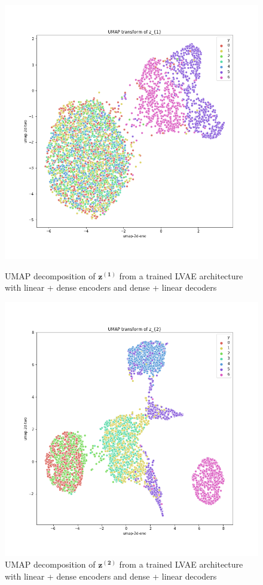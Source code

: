 \documentclass[12pt, english]{article}
\begin{document}
\begin{figure}[H] 
  \begin{minipage}{0.48\linewidth}
    \centering
    \includegraphics[width=.7\linewidth]{umap_z1_dense_lin_lin_no_norm.png}
    \caption{UMAP decomposition of $\bm{z^{(1)}}$ from a trained LVAE architecture with linear + dense encoders and dense + linear decoders}
    \label{fig:umap-z1}
  \end{minipage}\hfill
  \begin{minipage}{0.48\linewidth}
    \centering
    \includegraphics[width=.7\linewidth]{umap_z2_dense_lin_lin_no_norm.png} 
    \caption{UMAP decomposition of $\bm{z^{(2)}}$ from a trained LVAE architecture with linear + dense encoders and dense + linear decoders} 
    \label{fig:umap-z2}
  \end{minipage} 
\end{figure}
\end{document}
